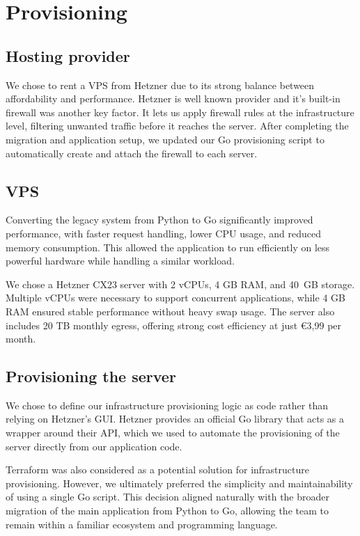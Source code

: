 \section{Provisioning}

\subsection{Hosting provider}

We chose to rent a VPS from Hetzner due to its strong balance between affordability and performance. Hetzner is well known provider and it's built-in firewall was another key factor. It lets us apply firewall rules at the infrastructure level, filtering unwanted traffic before it reaches the server. After completing the migration and application setup, we updated our Go provisioning script to automatically create and attach the firewall to each server.

\subsection{VPS}

Converting the legacy system from Python to Go significantly improved performance, with faster request handling, lower CPU usage, and reduced memory consumption. This allowed the application to run efficiently on less powerful hardware while handling a similar workload.

We chose a Hetzner CX23 server with 2 vCPUs, 4 GB RAM, and 40~GB storage. Multiple vCPUs were necessary to support concurrent applications, while 4 GB RAM ensured stable performance without heavy swap usage. The server also includes 20 TB monthly egress, offering strong cost efficiency at just \euro3,99 per month.

\subsection{Provisioning the server}

We chose to define our infrastructure provisioning logic as code rather than relying on Hetzner's GUI. Hetzner provides an official Go library that acts as a wrapper around their API, which we used to automate the provisioning of the server directly from our application code.

Terraform was also considered as a potential solution for infrastructure provisioning. However, we ultimately preferred the simplicity and maintainability of using a single Go script. This decision aligned naturally with the broader migration of the main application from Python to Go, allowing the team to remain within a familiar ecosystem and programming language.

